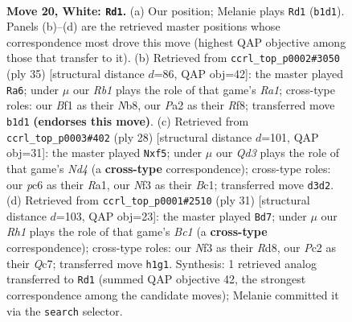 \documentclass[11pt]{article}
\begin{document}
\clearpage

\begin{figure}[p]\centering
\begin{subfigure}{0.46\textwidth}\centering
\resizebox{\linewidth}{!}{%
\newchessgame
\chessboard[
  setfen={r1b1qrk1/1p1n3p/n1p1p3/p2p1p2/3P1P2/2NQ1N2/PPP2KPP/1R3B1R w - - 2 20},
  showmover=false,
  pgfstyle=straightmove, color=movearrow, markmove={b1-d1}
]}
\caption{}
\end{subfigure}\hfill
\begin{subfigure}{0.46\textwidth}\centering
\resizebox{\linewidth}{!}{%
\newchessgame
\chessboard[
  setfen={rn3rk1/3bqpp1/3p1n2/p6p/Np1NPP1P/1P4P1/P2Q2B1/R4RK1 b - - 1 18},
  showmover=false,
  pgfstyle=straightmove, color=movearrow, markmove={a8-a6}
]}
\caption{}
\end{subfigure}
\\[4pt]
\begin{subfigure}{0.46\textwidth}\centering
\resizebox{\linewidth}{!}{%
\newchessgame
\chessboard[
  setfen={r3qrk1/p2pb1pp/npp2n2/5p2/3N4/P1N3P1/1PQ1PPKP/R1BR4 w - - 0 15},
  showmover=false,
  pgfstyle=straightmove, color=movearrow, markmove={d4-f5}
]}
\caption{}
\end{subfigure}\hfill
\begin{subfigure}{0.46\textwidth}\centering
\resizebox{\linewidth}{!}{%
\newchessgame
\chessboard[
  setfen={r1br2k1/2q2pp1/ppn1pn1p/3p4/NP6/P1P1PN1P/2Q1BPP1/2R2RK1 b - - 1 16},
  showmover=false,
  pgfstyle=straightmove, color=movearrow, markmove={c8-d7}
]}
\caption{}
\end{subfigure}
\caption{\textbf{Move 20, White: \texttt{Rd1}.} (a) Our position; Melanie plays \texttt{Rd1} (\texttt{b1d1}). Panels (b)--(d) are the retrieved master positions whose correspondence most drove this move (highest QAP objective among those that transfer to it). (b) Retrieved from \texttt{ccrl\_top\_p0002\#3050} (ply 35) [structural distance $d$=86, QAP obj=42]: the master played \texttt{Ra6}; under $\mu$ our \emph{Rb1} plays the role of that game's \emph{Ra1}; cross-type roles: our \emph{B}f1 as their \emph{N}b8, our \emph{P}a2 as their \emph{R}f8; transferred move \texttt{b1d1} \textbf{(endorses this move)}. (c) Retrieved from \texttt{ccrl\_top\_p0003\#402} (ply 28) [structural distance $d$=101, QAP obj=31]: the master played \texttt{Nxf5}; under $\mu$ our \emph{Qd3} plays the role of that game's \emph{Nd4} (a \textbf{cross-type} correspondence); cross-type roles: our \emph{p}c6 as their \emph{R}a1, our \emph{N}f3 as their \emph{B}c1; transferred move \texttt{d3d2}. (d) Retrieved from \texttt{ccrl\_top\_p0001\#2510} (ply 31) [structural distance $d$=103, QAP obj=23]: the master played \texttt{Bd7}; under $\mu$ our \emph{Rh1} plays the role of that game's \emph{Bc1} (a \textbf{cross-type} correspondence); cross-type roles: our \emph{N}f3 as their \emph{R}d8, our \emph{P}c2 as their \emph{Q}c7; transferred move \texttt{h1g1}. Synthesis: 1 retrieved analog transferred to \texttt{Rd1} (summed QAP objective 42, the strongest correspondence among the candidate moves); Melanie committed it via the \texttt{search} selector.}
\label{fig:thought-m38}
\end{figure}
\end{document}
